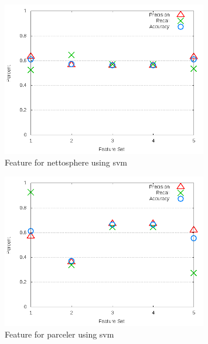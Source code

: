 \begin{figure}[!t]
\centering
\includegraphics[width=0.8\textwidth]{images/svm/test_3/nettosphere_sample_range.png}
\caption{Feature for nettosphere using \gls{svm}}
\label{fig:test_3_nettosphere_svm}
\end{figure}

\begin{figure}[!t]
\centering
\includegraphics[width=0.8\textwidth]{images/svm/test_3/parceler_sample_range.png}
\caption{Feature for parceler using \gls{svm}}
\label{fig:test_3_parceler_svm}
\end{figure}


